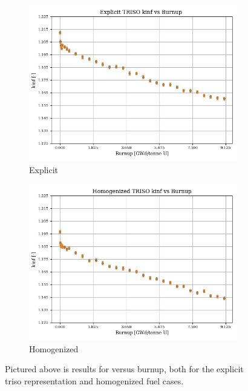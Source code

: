 \documentclass[letterpaper]{physor2024}
\begin{document}
\begin{figure}[!h]
    \centering
    \begin{subfigure}{0.49\linewidth}
        \centering
        \includegraphics[width=\linewidth]{figures/explicit_kinf_vs_burnup.png}
        \caption{Explicit}
        \label{fig:explicit}
    \end{subfigure}
    \begin{subfigure}{0.49\linewidth}
        \centering
        \includegraphics[width=\linewidth]{figures/homogenized_kinf_vs_burnup.png}
        \caption{Homogenized}
        \label{fig:explicit}
    \end{subfigure}
    \caption{Pictured above is results for \kinf versus burnup, both for the explicit \gls{triso} representation and homogenized fuel cases.}
    \label{fig:kinfvsburnup}
\end{figure}
\end{document}
